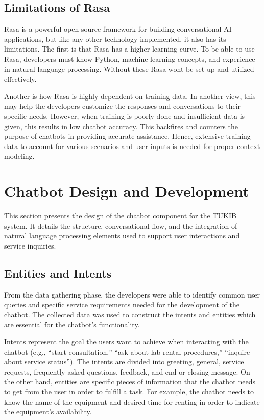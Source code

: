 \subsection {Limitations of Rasa}

Rasa is a powerful open-source framework for building conversational AI applications, but like any other technology implemented, it also has its limitations. The first is that Rasa has a higher learning curve. To be able to use Rasa, developers must know Python, machine learning concepts, and experience in natural language processing. Without these Rasa wont be set up and utilized effectively. 

Another is how Rasa is highly dependent on training data. In another view, this may help the developers customize the responses and conversations to their specific needs. However, when training is poorly done and insufficient data is given, this results in low chatbot accuracy. This backfires and counters the purpose of chatbots in providing accurate assistance. Hence, extensive training data to account for various scenarios and user inputs is needed for proper context modeling.

\section{Chatbot Design and Development}
This section presents the design of the chatbot component for the TUKIB system. It details the structure, conversational flow, and the integration of natural language processing elements used to support user interactions and service inquiries.

\subsection{Entities and Intents}

From the data gathering phase, the developers were able to identify common user queries and specific service requirements needed for the development of the chatbot. The collected data was used to construct the intents and entities which are essential for the chatbot’s functionality. 

Intents represent the goal the users want to achieve when interacting with the chatbot (e.g., ``start consultation,” ``ask about lab rental procedures,” ``inquire about service status”). The intents are divided into greeting, general, service requests, frequently asked questions, feedback, and end or closing message. On the other hand, entities are specific pieces of information that the chatbot needs to get from the user in order to fulfill a task. For example, the chatbot needs to know the name of the equipment and desired time for renting in order to indicate the equipment's availability. 

